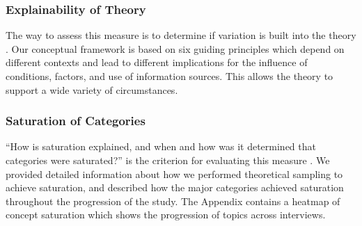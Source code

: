 \subsubsection{Explainability of Theory} The way to assess this measure is to determine if variation is built into the theory \cite{corbin2014gt}. Our conceptual framework is based on six guiding principles which depend on different contexts and lead to different implications for the influence of conditions, factors, and use of information sources. This allows the theory to support a wide variety of circumstances.

\subsubsection{Saturation of Categories} ``How is saturation explained, and when and how was it determined that categories were saturated?'' is the criterion for evaluating this measure \cite{corbin2014gt}. We provided detailed information about how we performed theoretical sampling to achieve saturation, and described how the major categories achieved saturation throughout the progression of the study. The Appendix contains a heatmap of concept saturation which shows the progression of topics across interviews.




